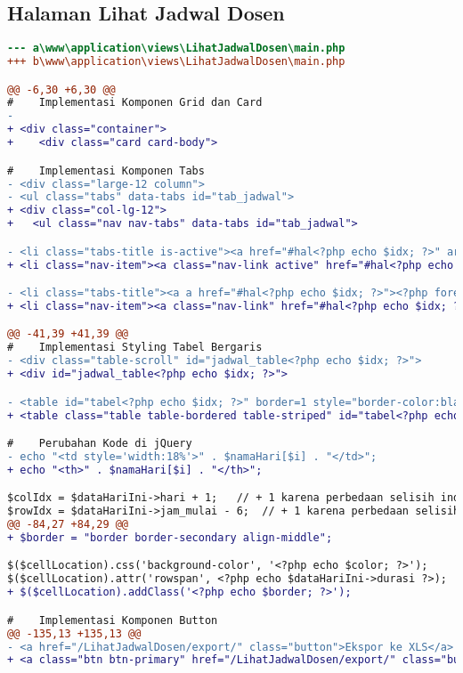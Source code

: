 \subsection{Halaman	Lihat Jadwal Dosen}
\begin{lstlisting}[language=diff, caption=Kode untuk Halaman Lihat Jadwal Dosen,  basicstyle=\ttfamily, frame=single,
columns=fullflexible, keepspaces=true, breaklines=true, label={lst:mainEntriJadwalDosen}]
--- a\www\application\views\LihatJadwalDosen\main.php
+++ b\www\application\views\LihatJadwalDosen\main.php

@@ -6,30 +6,30 @@
#    Implementasi Komponen Grid dan Card
-
+ <div class="container">
+    <div class="card card-body">

#    Implementasi Komponen Tabs
- <div class="large-12 column">
- <ul class="tabs" data-tabs id="tab_jadwal">
+ <div class="col-lg-12">
+	<ul class="nav nav-tabs" data-tabs id="tab_jadwal">

- <li class="tabs-title is-active"><a href="#hal<?php echo $idx; ?>" aria-selected="true"><?php foreach ($currRow as $data) {
+ <li class="nav-item"><a class="nav-link active" href="#hal<?php echo $idx; ?>" 

- <li class="tabs-title"><a a href="#hal<?php echo $idx; ?>"><?php foreach ($currRow as $data) {
+ <li class="nav-item"><a class="nav-link" href="#hal<?php echo $idx; ?>"><?php foreach ($currRow as $data) {

@@ -41,39 +41,39 @@
#    Implementasi Styling Tabel Bergaris
- <div class="table-scroll" id="jadwal_table<?php echo $idx; ?>">
+ <div id="jadwal_table<?php echo $idx; ?>">

- <table id="tabel<?php echo $idx; ?>" border=1 style="border-color:black ; border-collapse:separate">
+ <table class="table table-bordered table-striped" id="tabel<?php echo $idx; ?>" >

#    Perubahan Kode di jQuery
- echo "<td style='width:18%'>" . $namaHari[$i] . "</td>";
+ echo "<th>" . $namaHari[$i] . "</th>";

$colIdx = $dataHariIni->hari + 1;   // + 1 karena perbedaan selisih index tabel dan value hari di database 
$rowIdx = $dataHariIni->jam_mulai - 6;  // + 1 karena perbedaan selisih index tabel dan value jam_mulai di database 
@@ -84,27 +84,29 @@
+ $border = "border border-secondary align-middle";

$($cellLocation).css('background-color', '<?php echo $color; ?>');
$($cellLocation).attr('rowspan', <?php echo $dataHariIni->durasi ?>);
+ $($cellLocation).addClass('<?php echo $border; ?>');

#    Implementasi Komponen Button
@@ -135,13 +135,13 @@
- <a href="/LihatJadwalDosen/export/" class="button">Ekspor ke XLS</a>
+ <a class="btn btn-primary" href="/LihatJadwalDosen/export/" class="button">Ekspor ke XLS</a>
\end{lstlisting}


 





